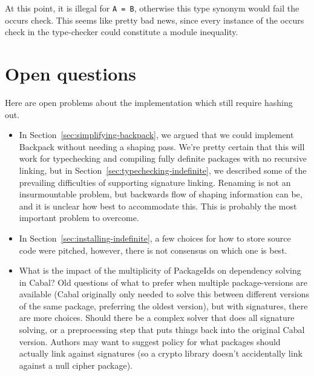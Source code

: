 \documentclass{article}
\begin{document}
At this point, it is illegal for \verb|A = B|, otherwise this type synonym would
fail the occurs check.  This seems like pretty bad news, since every instance
of the occurs check in the type-checker could constitute a module inequality.

\section{Open questions}\label{sec:open-questions}

Here are open problems about the implementation which still require
hashing out.

\begin{itemize}

    \item In Section~\ref{sec:simplifying-backpack}, we argued that we
        could implement Backpack without needing a shaping pass. We're
        pretty certain that this will work for typechecking and
        compiling fully definite packages with no recursive linking, but
        in Section~\ref{sec:typechecking-indefinite}, we described some
        of the prevailing difficulties of supporting signature linking.
        Renaming is not an insurmountable problem, but backwards flow of
        shaping information can be, and it is unclear how best to
        accommodate this.  This is probably the most important problem
        to overcome.

    \item In Section~\ref{sec:installing-indefinite}, a few choices for how to
        store source code were pitched, however, there is not consensus on which
        one is best.

    \item What is the impact of the multiplicity of PackageIds on
        dependency solving in Cabal?  Old questions of what to prefer
        when multiple package-versions are available (Cabal originally
        only needed to solve this between different versions of the same
        package, preferring the oldest version), but with signatures,
        there are more choices.  Should there be a complex solver that
        does all signature solving, or a preprocessing step that puts
        things back into the original Cabal version.  Authors may want
        to suggest policy for what packages should actually link against
        signatures (so a crypto library doesn't accidentally link
        against a null cipher package).

\end{itemize}
\end{document}

